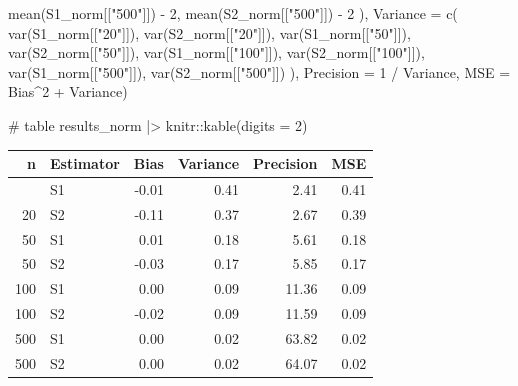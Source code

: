 \documentclass[
]{article}
\newenvironment{Shaded}{\begin{snugshade}}{\end{snugshade}}
\newcommand{\AttributeTok}[1]{\textcolor[rgb]{0.40,0.45,0.13}{#1}}
\newcommand{\CommentTok}[1]{\textcolor[rgb]{0.37,0.37,0.37}{#1}}
\newcommand{\DecValTok}[1]{\textcolor[rgb]{0.68,0.00,0.00}{#1}}
\newcommand{\FunctionTok}[1]{\textcolor[rgb]{0.28,0.35,0.67}{#1}}
\newcommand{\NormalTok}[1]{\textcolor[rgb]{0.00,0.23,0.31}{#1}}
\newcommand{\SpecialCharTok}[1]{\textcolor[rgb]{0.37,0.37,0.37}{#1}}
\newcommand{\StringTok}[1]{\textcolor[rgb]{0.13,0.47,0.30}{#1}}
\begin{document}
\begin{Shaded}
\begin{Highlighting}[numbers=left,,]
    \FunctionTok{mean}\NormalTok{(S1\_norm[[}\StringTok{"500"}\NormalTok{]]) }\SpecialCharTok{{-}} \DecValTok{2}\NormalTok{, }\FunctionTok{mean}\NormalTok{(S2\_norm[[}\StringTok{"500"}\NormalTok{]]) }\SpecialCharTok{{-}} \DecValTok{2}
\NormalTok{  ),}
  \AttributeTok{Variance =} \FunctionTok{c}\NormalTok{(}
    \FunctionTok{var}\NormalTok{(S1\_norm[[}\StringTok{"20"}\NormalTok{]]),  }\FunctionTok{var}\NormalTok{(S2\_norm[[}\StringTok{"20"}\NormalTok{]]),}
    \FunctionTok{var}\NormalTok{(S1\_norm[[}\StringTok{"50"}\NormalTok{]]),  }\FunctionTok{var}\NormalTok{(S2\_norm[[}\StringTok{"50"}\NormalTok{]]),}
    \FunctionTok{var}\NormalTok{(S1\_norm[[}\StringTok{"100"}\NormalTok{]]), }\FunctionTok{var}\NormalTok{(S2\_norm[[}\StringTok{"100"}\NormalTok{]]),}
    \FunctionTok{var}\NormalTok{(S1\_norm[[}\StringTok{"500"}\NormalTok{]]), }\FunctionTok{var}\NormalTok{(S2\_norm[[}\StringTok{"500"}\NormalTok{]])}
\NormalTok{  ),}
  \AttributeTok{Precision =} \DecValTok{1} \SpecialCharTok{/}\NormalTok{ Variance,}
  \AttributeTok{MSE =}\NormalTok{ Bias}\SpecialCharTok{\^{}}\DecValTok{2} \SpecialCharTok{+}\NormalTok{ Variance)}

\CommentTok{\# table}
\NormalTok{results\_norm }\SpecialCharTok{|\textgreater{}}\NormalTok{ knitr}\SpecialCharTok{::}\FunctionTok{kable}\NormalTok{(}\AttributeTok{digits =} \DecValTok{2}\NormalTok{)}
\end{Highlighting}
\end{Shaded}

\begin{longtable}[]{@{}rlrrrr@{}}
\toprule\noalign{}
n & Estimator & Bias & Variance & Precision & MSE \\
\midrule\noalign{}
\endhead
\bottomrule\noalign{}
\endlastfoot
20 & S1 & -0.01 & 0.41 & 2.41 & 0.41 \\
20 & S2 & -0.11 & 0.37 & 2.67 & 0.39 \\
50 & S1 & 0.01 & 0.18 & 5.61 & 0.18 \\
50 & S2 & -0.03 & 0.17 & 5.85 & 0.17 \\
100 & S1 & 0.00 & 0.09 & 11.36 & 0.09 \\
100 & S2 & -0.02 & 0.09 & 11.59 & 0.09 \\
500 & S1 & 0.00 & 0.02 & 63.82 & 0.02 \\
500 & S2 & 0.00 & 0.02 & 64.07 & 0.02 \\
\end{longtable}
\end{document}
